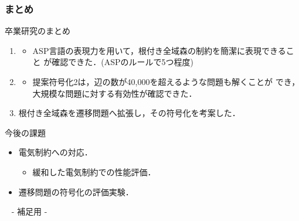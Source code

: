\documentclass[dvipdfmx,11pt]{beamer}
\begin{document}
\begin{frame}\frametitle{まとめ}
 \begin{block}{卒業研究のまとめ}
  \begin{enumerate}
   \item {}
   \begin{itemize}
	\item ASP言語の表現力を用いて，根付き全域森の制約を簡潔に表現できること
		  が確認できた．(ASPのルールで5つ程度)
   \end{itemize}
   \item {}
   \begin{itemize}
	\item 提案符号化2は，辺の数が40,000を超えるような問題も解くことが
		  でき，大規模な問題に対する有効性が確認できた．
   \end{itemize}
   \item 根付き全域森を遷移問題へ拡張し，その符号化を考案した．
  \end{enumerate}
 \end{block}
 
 \begin{alertblock}{今後の課題}
  \begin{itemize}
   \item 電気制約への対応．
		 \begin{itemize}
		  \item 緩和した電気制約での性能評価．
		 \end{itemize}
   \item 遷移問題の符号化の評価実験．
  \end{itemize}
 \end{alertblock}
\end{frame}



\begin{frame}{~}
 \centering
 - 補足用 -
\end{frame} 
\end{document}
